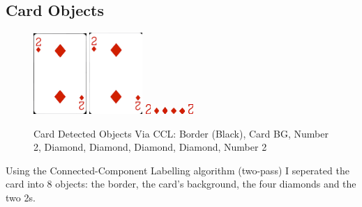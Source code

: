\documentclass[conference]{IEEEtran}
\begin{document}
\subsection{Card Objects}
\begin{figure}[H]
    \centerline{
        {\includegraphics[width=20mm, scale=0.5]{./figures/task 3/card/DetectedObject-1.png}}
        {\includegraphics[width=20mm, scale=0.5]{./figures/task 3/card/DetectedObject-2.png}}
        {\includegraphics[width=2mm, scale=0.5]{./figures/task 3/card/DetectedObject-3.png}}
        {\includegraphics[width=2mm, scale=0.5]{./figures/task 3/card/DetectedObject-4.png}}
        {\includegraphics[width=2mm, scale=0.5]{./figures/task 3/card/DetectedObject-5.png}}
        {\includegraphics[width=2mm, scale=0.5]{./figures/task 3/card/DetectedObject-6.png}}
        {\includegraphics[width=2mm, scale=0.5]{./figures/task 3/card/DetectedObject-7.png}}
        {\includegraphics[width=2mm, scale=0.5]{./figures/task 3/card/DetectedObject-8.png}}
    }
    \caption{Card Detected Objects Via CCL: Border (Black), Card BG, Number 2, Diamond, Diamond, Diamond, Diamond, Number 2}
    \label{fig}
\end{figure}
Using the Connected-Component Labelling algorithm (two-pass) I seperated the card into 8 objects: the border, the card's background, the four diamonds and the two 2s.
\end{document}

